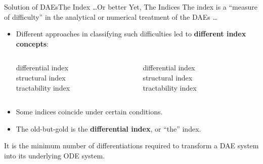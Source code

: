 \begin{frame}{Solution of \aclp{DAE}}{The Index \dots Or better Yet, The Indices}
  The index is a ``measure of difficulty'' in the analytical or numerical treatment of the \acp{DAE} \dots
  \begin{itemize}
    \item Different approaches in classifying such difficulties led to \textbf{different index concepts}:
    \begin{columns}
      \begin{column}[t]{0.45\textwidth}
        \centering\small
        differential index \\
        structural index \\
        tractability index
      \end{column}
      \begin{column}[t]{0.45\textwidth}
        \centering\small
        differential index \\
        structural index \\
        tractability index
      \end{column}
    \end{columns}
    \item Some indices coincide under certain conditions.
    \item The old-but-gold is the \textbf{differential index}, or ``the'' index.
  \end{itemize}
  \vspace{0.5em}
  \begin{bbox}
    It is the minimum number of differentiations required to transform a \ac{DAE} system into its underlying \ac{ODE} system.
  \end{bbox}
\end{frame}

